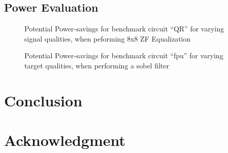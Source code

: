 \documentclass[conference]{IEEEtran}
\begin{document}
\subsection{Power Evaluation}
\begin{figure}[tb]
  \centering
  \caption{Potential Power-savings for benchmark circuit ``QR'' for varying signal qualities, when peforming 8x8 ZF Equalization}
  \label{fig:power_qr}
\end{figure}
\begin{figure}[tb]
  \centering
  \caption{Potential Power-savings for benchmark circuit ``fpu'' for varying target qualities, when performing a sobel filter}
  \label{fig:power_fpu}
\end{figure}
















\section{Conclusion}
\label{sec:conclusion}






\section*{Acknowledgment}













\end{document}
